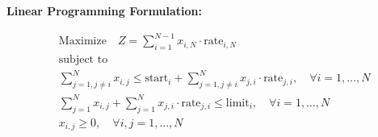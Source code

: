 \documentclass{article}
\begin{document}
\textbf{Linear Programming Formulation:}

\begin{align*}
& \text{Maximize} \quad Z = \sum_{i=1}^{N-1} x_{i,N} \cdot \text{rate}_{i,N} \\
& \text{subject to} \\
& \sum_{j=1, j \neq i}^{N} x_{i,j} \leq \text{start}_i + \sum_{j=1, j \neq i}^{N} x_{j,i} \cdot \text{rate}_{j,i}, \quad \forall i = 1, \ldots, N \\
& \sum_{j=1}^{N} x_{i,j} + \sum_{j=1}^{N} x_{j,i} \cdot \text{rate}_{j,i} \leq \text{limit}_i, \quad \forall i = 1, \ldots, N \\
& x_{i,j} \geq 0, \quad \forall i, j = 1, \ldots, N
\end{align*}
\end{document}

